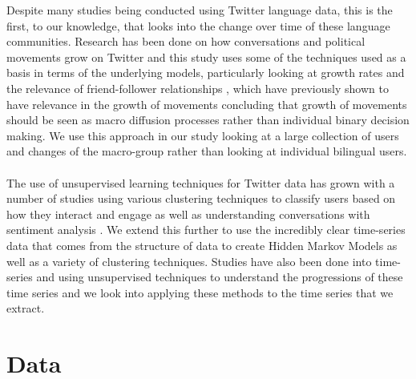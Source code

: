 \documentclass[12pt]{article}
\begin{document}
Despite many studies being conducted using Twitter language data, this is the first, to our knowledge, that looks into the change over time of these language communities. Research has been done on how conversations and political movements grow on Twitter \cite{HMM, Gonzalez} and this study uses some of the techniques used as a basis in terms of the underlying models, particularly looking at growth rates and the relevance of friend-follower relationships \cite{Gonzalez}, which have previously shown to have relevance in the growth of movements concluding that growth of movements should be seen as macro diffusion processes rather than individual binary decision making. We use this approach in our study looking at a large collection of users and changes of the macro-group rather than looking at individual bilingual users. \\\\
The use of unsupervised learning techniques for Twitter data has grown with a number of studies using various clustering techniques to classify users based on how they interact and engage \cite{Goncalves}  as well as understanding conversations with sentiment analysis \cite{HMM}. We extend this further to use the incredibly clear time-series data that comes from the structure of data to create Hidden Markov Models as well as a variety of clustering techniques. Studies have also been done into time-series and using unsupervised techniques to understand the progressions of these time series \cite{Oates} and we look into applying these methods to the time series that we extract.

\newpage
\section{Data}
\end{document}
